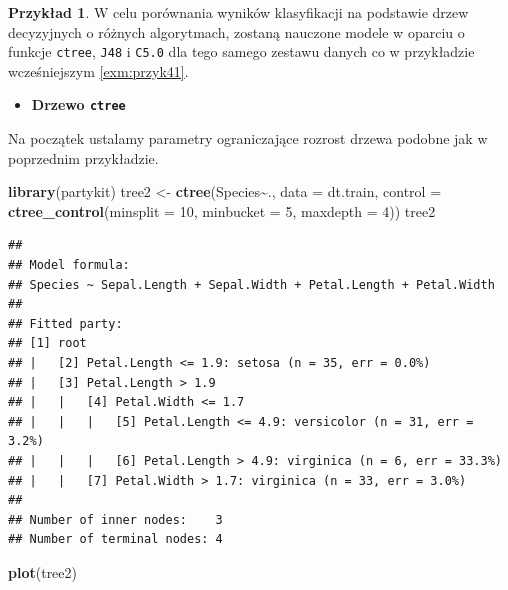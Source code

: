 \documentclass[
]{book}
\newenvironment{Shaded}{\begin{snugshade}}{\end{snugshade}}
\newcommand{\AttributeTok}[1]{\textcolor[rgb]{0.13,0.29,0.53}{#1}}
\newcommand{\DecValTok}[1]{\textcolor[rgb]{0.00,0.00,0.81}{#1}}
\newcommand{\FunctionTok}[1]{\textcolor[rgb]{0.13,0.29,0.53}{\textbf{#1}}}
\newcommand{\NormalTok}[1]{#1}
\newcommand{\OtherTok}[1]{\textcolor[rgb]{0.56,0.35,0.01}{#1}}
\newcommand{\SpecialCharTok}[1]{\textcolor[rgb]{0.81,0.36,0.00}{\textbf{#1}}}
\providecommand{\tightlist}{%
  \setlength{\itemsep}{0pt}\setlength{\parskip}{0pt}}
\theoremstyle{plain}
\theoremstyle{definition}
\theoremstyle{definition}
\theoremstyle{definition}
\newtheorem{example}{Przykład}[chapter]
\theoremstyle{definition}
\theoremstyle{definition}
\theoremstyle{remark}
\begin{document}
\begin{example}
\protect\hypertarget{exm:przyk42}{}\label{exm:przyk42}W celu porównania wyników klasyfikacji na podstawie drzew decyzyjnych o różnych algorytmach, zostaną nauczone modele w oparciu o funkcje \texttt{ctree}, \texttt{J48} i \texttt{C5.0} dla tego samego zestawu danych co w przykładzie wcześniejszym \ref{exm:przyk41}.
\end{example}

\begin{itemize}
\tightlist
\item
  \textbf{Drzewo \texttt{ctree}}
\end{itemize}

Na początek ustalamy parametry ograniczające rozrost drzewa podobne jak w poprzednim przykładzie.

\begin{Shaded}
\begin{Highlighting}[]
\FunctionTok{library}\NormalTok{(partykit)}
\NormalTok{tree2 }\OtherTok{\textless{}{-}} \FunctionTok{ctree}\NormalTok{(Species}\SpecialCharTok{\textasciitilde{}}\NormalTok{., }\AttributeTok{data =}\NormalTok{ dt.train,}
               \AttributeTok{control =} \FunctionTok{ctree\_control}\NormalTok{(}\AttributeTok{minsplit =} \DecValTok{10}\NormalTok{,}
                                       \AttributeTok{minbucket =} \DecValTok{5}\NormalTok{,}
                                       \AttributeTok{maxdepth =} \DecValTok{4}\NormalTok{))}
\NormalTok{tree2}
\end{Highlighting}
\end{Shaded}

\begin{verbatim}
## 
## Model formula:
## Species ~ Sepal.Length + Sepal.Width + Petal.Length + Petal.Width
## 
## Fitted party:
## [1] root
## |   [2] Petal.Length <= 1.9: setosa (n = 35, err = 0.0%)
## |   [3] Petal.Length > 1.9
## |   |   [4] Petal.Width <= 1.7
## |   |   |   [5] Petal.Length <= 4.9: versicolor (n = 31, err = 3.2%)
## |   |   |   [6] Petal.Length > 4.9: virginica (n = 6, err = 33.3%)
## |   |   [7] Petal.Width > 1.7: virginica (n = 33, err = 3.0%)
## 
## Number of inner nodes:    3
## Number of terminal nodes: 4
\end{verbatim}

\begin{Shaded}
\begin{Highlighting}[]
\FunctionTok{plot}\NormalTok{(tree2)}
\end{Highlighting}
\end{Shaded}
\end{document}
